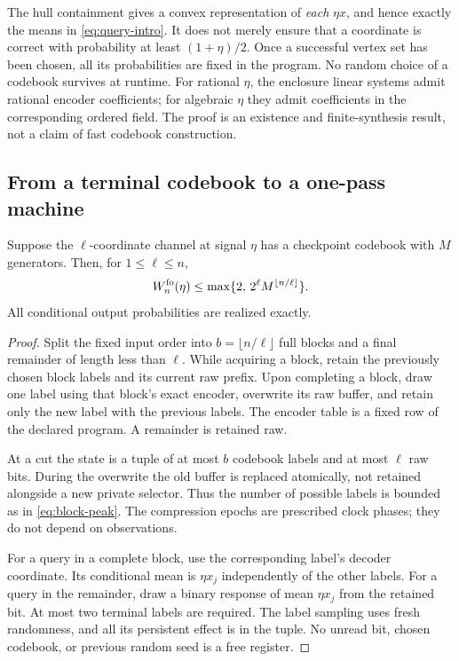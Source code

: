 The hull containment gives a convex representation of \emph{each}
$\eta x$, and hence exactly the means in \eqref{eq:query-intro}.
It does not merely ensure that a coordinate is correct with probability
at least $(1+\eta)/2$. Once a successful vertex set has been chosen,
all its probabilities are fixed in the program. No random choice of a
codebook survives at runtime. For rational $\eta$, the enclosure
linear systems admit rational encoder coefficients; for algebraic
$\eta$ they admit coefficients in the corresponding ordered field.
The proof is an existence and finite-synthesis result, not a claim of
fast codebook construction.

\subsection{From a terminal codebook to a one-pass machine}
\begin{lemma}\label{lem:blocks}
Suppose the $\ell$-coordinate channel at signal $\eta$ has a
checkpoint codebook with $M$ generators. Then, for $1\le\ell\le n$,
\begin{equation}\label{eq:block-peak}
 W_n^{\rm fo}(\eta)\le
        \max\{2,\,2^\ell M^{\lfloor n/\ell\rfloor}\}.
\end{equation}
All conditional output probabilities are realized exactly.
\end{lemma}
\begin{proof}
Split the fixed input order into $b=\lfloor n/\ell\rfloor$ full
blocks and a final remainder of length less than $\ell$.
While acquiring a block, retain the previously chosen block labels and
its current raw prefix. Upon completing a block, draw one label using
that block's exact encoder, overwrite its raw buffer, and retain only
the new label with the previous labels. The encoder table is a fixed
row of the declared program. A remainder is retained raw.

At a cut the state is a tuple of at most $b$ codebook labels and at
most $\ell$ raw bits. During the overwrite the old buffer is replaced
atomically, not retained alongside a new private selector. Thus the
number of possible labels is bounded as in \eqref{eq:block-peak}.
The compression epochs are prescribed clock phases; they do not depend
on observations.

For a query in a complete block, use the corresponding label's decoder
coordinate. Its conditional mean is $\eta x_j$ independently of the
other labels. For a query in the remainder, draw a binary response of
mean $\eta x_j$ from the retained bit. At most two terminal labels
are required. The label sampling uses fresh randomness, and all its
persistent effect is in the tuple. No unread bit, chosen codebook, or
previous random seed is a free register.
\end{proof}

